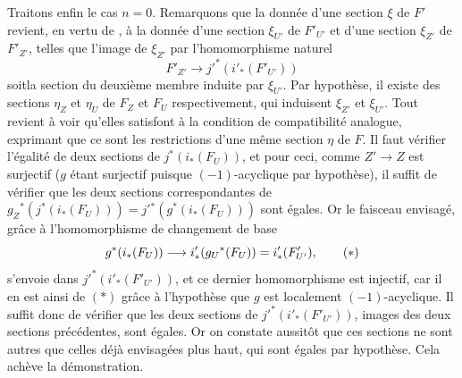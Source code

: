 \documentclass[10pt]{../fichiers-configuration-latex/smfart}
\begin{document}
Traitons enfin le cas $n=0$. Remarquons que la donnée d'une section
$\xi$ de $F'$ revient, en vertu de \sisi{\qquad}{\qquad},
à la donnée d'une section $\xi_{U'}$ de $F'_{U'}$ et d'une section $\xi_{Z'}$ de $F'_{Z'}$,
telles que l'image de $\xi_{Z'}$ par l'homomorphisme naturel
$$
F'_{Z'}\longrightarrow {j'}^{\ast}(i'_{\ast}(F'_{U'}))
$$
soit\pageoriginale la section du deuxième membre induite par
$\xi_{U'}$. Par hypothèse, il existe des sections $\eta_Z$ et $\eta_U$
de $F_Z$ et $F_U$ respectivement, qui induisent $\xi_{Z'}$ et
$\xi_{U'}$. Tout revient à voir qu'elles satisfont à la condition de
compatibilité analogue, exprimant que ce sont les restrictions d'une
même section $\eta$ de $F$. Il faut vérifier l'égalité de deux
sections de $j^{\ast}(i_{\ast}(F_U))$, et pour ceci, comme
$Z'\rightarrow Z$ est surjectif ($g$ étant surjectif puisque
$(-1)$-acyclique par hypothèse), il suffit de vérifier que les deux
sections correspondantes de
$g_Z{}^{\ast}(j^{\ast}(i_{\ast}(F_U)))=j'{}^{\ast}(g^{\ast}(i_{\ast}(F_U)))$
sont égales. Or le faisceau envisagé, grâce à l'homomorphisme de
changement de base
\begin{equation*}
g^{\ast}(i_{\ast}(F_U))\longrightarrow
i'_{\ast}(g_U{}^{\ast}(F_U))=i'_{\ast}(F'_{U'}){},\tag{$\ast$}
\end{equation*}
s'envoie dans ${j'}^{\ast}(i'_{\ast}(F'_{U'}))$, et ce dernier
homomorphisme est injectif, car il en est ainsi de $(\ast)$ grâce à
l'hypothèse que $g$ est localement $(-1)$-acyclique. Il suffit donc de
vérifier que les deux sections de ${j'}^{\ast}(i'_{\ast}(F'_{U'}))$,
images des deux sections précédentes, sont égales. Or on constate
aussitôt que ces sections ne sont autres que celles déjà envisagées
plus haut, qui sont égales par hypothèse. Cela achève la
démonstration.
\end{document}
